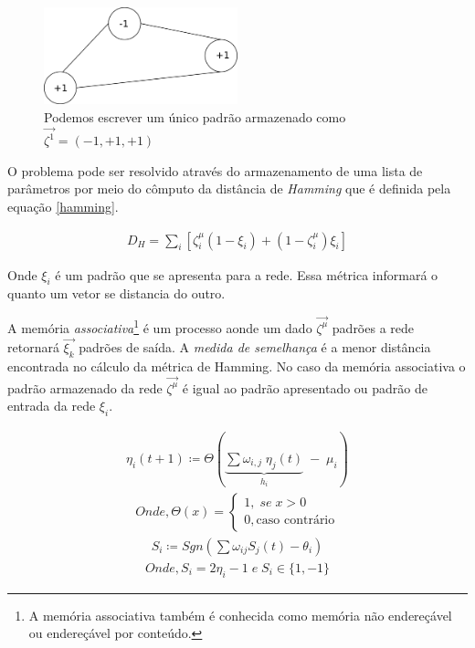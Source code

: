 \begin{figure}[H]
	\centering
	\includegraphics[width=0.5\textwidth]{Imagens/Fig19.png}
	\caption{Podemos escrever um único padrão armazenado como $\vec{\zeta^{1}}=(-1,+1,+1)$}
	\label{1padrao}
\end{figure}

O problema pode ser resolvido através do armazenamento de uma lista de parâmetros por meio do cômputo da distância de \textit{Hamming} que é definida pela equação \ref{hamming}.

\begin{eqnarray}
D_{H} = \sum_{i} [ \zeta^{\mu}_{i} (1-\xi_{i}) + (1 - \zeta^{\mu}_{i}) \xi_{i}]
\label{hamming}
\end{eqnarray}

Onde $\xi_{i}$ é um padrão que se apresenta para a rede. Essa métrica informará o quanto um vetor se distancia do outro.

A memória \textit{associativa}\footnote{A memória associativa também é conhecida como memória não endereçável ou endereçável por conteúdo.} é um processo aonde um dado $\vec{\zeta^{\mu}}$ padrões a rede retornará $\vec{\xi_{k}}$ padrões de saída. A \textit{medida de semelhança} é a menor distância encontrada no cálculo da métrica de Hamming. No caso da memória associativa o padrão armazenado da rede $\vec{\zeta^{\mu}}$ é igual ao padrão apresentado ou padrão de entrada da rede $\xi_{i}$.

\begin{tcolorbox}[colback=green!5,colframe=green!40!black,title=Faça a transformação de variáveis de \ref{ni} para \ref{si}.]
	\begin{eqnarray}
		\eta_{i}(t+1) \coloneqq \Theta\left( \underbrace{\sum \omega_{i,j}\; \eta_{j}(t)}_{h_{i}}\;-\;\mu_{i}\right) 
		\label{ni}
	\end{eqnarray}
	\begin{eqnarray}
	Onde, 
		\Theta(x)=
		\begin{cases}
		1,\; se\; x>0 \\ 
		0, \text{caso contrário}
		\end{cases} \nonumber
	\end{eqnarray}
	\begin{eqnarray}
		S_{i} \coloneqq Sgn (\sum \omega_{ij} S_{j}(t) - \theta_{i} )
		\label{si}
	\end{eqnarray}
	\begin{eqnarray}
	    Onde,
		S_{i}= 2\eta_{i}-1\; e\;  S_{i} \in\{1,-1\} \nonumber
	\end{eqnarray}
	
\end{tcolorbox}

 

\pagebreak
 
 

